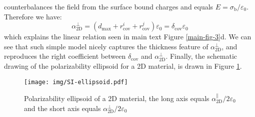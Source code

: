 \documentclass[manuscript=suppinfo,email=true,hyperref=true,keywords=false]{achemso}
\begin{document}
counterbalances the field from the surface bound charges and equals
$E = \sigma_{\mathrm{b}}/\varepsilon_{0}$. Therefore we have:
\begin{equation}
  \label{eq:alpha-classic-2}
  \alpha_{\mathrm{2D}}^{\perp} = (d_{\mathrm{max}} + r_{\mathrm{cov}}^{i} + r_{\mathrm{cov}}^{j})\varepsilon_{0}
                = \delta_{\mathrm{cov}} \varepsilon_{0}
\end{equation}
which explains the linear relation seen in main text Figure
\ref{main-fig-3}d. We can see that such simple model nicely captures
the thickness feature of $\alpha_{\mathrm{2D}}^{\perp}$, and
reproduces the right coefficient between $\delta_{\mathrm{cov}}$ and
$\alpha_{\mathrm{2D}}^{\perp}$. Finally, the schematic drawing of the
polarizability ellipsoid for a 2D material, is drawn in Figure
\ref{fig:ellipsoid}.
\begin{figure}[htbp]
  \centering
  \texttt{[image: img/SI-ellipsoid.pdf]}
  \caption{Polarizability ellipsoid of a 2D material, the long axis
    equals $\alpha_{\mathrm{2D}}^{\parallel}/2\varepsilon_{0}$ and the short axis
    equals  $\alpha_{\mathrm{2D}}^{\perp}/2\varepsilon_{0}$}
  \label{fig:ellipsoid}
\end{figure}
\end{document}

